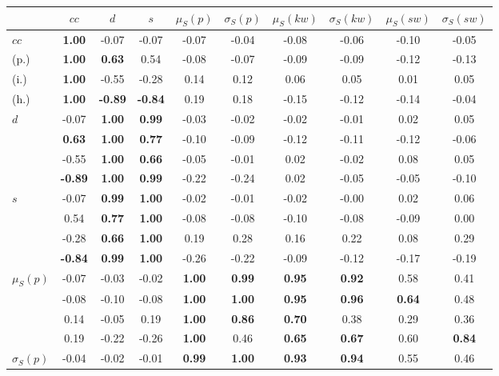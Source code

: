 \begin{table*}[h!]
\begin{center}
\begin{tabular}{| l || c | c | c | c | c | c | c | c | c |}\hline
 & $cc$ & $d$ & $s$ & $\mu_S(p)$ & $\sigma_S(p)$ & $\mu_S(kw)$ & $\sigma_S(kw)$ & $\mu_S(sw)$ & $\sigma_S(sw)$ \\\hline\hline
$cc$ & {\bf 1.00} & -0.07 & -0.07 & -0.07 & -0.04 & -0.08 & -0.06 & -0.10 & -0.05 \\
(p.) & {\bf 1.00} & {\bf 0.63} & 0.54 & -0.08 & -0.07 & -0.09 & -0.09 & -0.12 & -0.13 \\
(i.) & {\bf 1.00} & -0.55 & -0.28 & 0.14 & 0.12 & 0.06 & 0.05 & 0.01 & 0.05 \\
(h.) & {\bf 1.00} & {\bf -0.89} & {\bf -0.84} & 0.19 & 0.18 & -0.15 & -0.12 & -0.14 & -0.04 \\\hline
$d$ & -0.07 & {\bf 1.00} & {\bf 0.99} & -0.03 & -0.02 & -0.02 & -0.01 & 0.02 & 0.05 \\
 & {\bf 0.63} & {\bf 1.00} & {\bf 0.77} & -0.10 & -0.09 & -0.12 & -0.11 & -0.12 & -0.06 \\
 & -0.55 & {\bf 1.00} & {\bf 0.66} & -0.05 & -0.01 & 0.02 & -0.02 & 0.08 & 0.05 \\
 & {\bf -0.89} & {\bf 1.00} & {\bf 0.99} & -0.22 & -0.24 & 0.02 & -0.05 & -0.05 & -0.10 \\\hline
$s$ & -0.07 & {\bf 0.99} & {\bf 1.00} & -0.02 & -0.01 & -0.02 & -0.00 & 0.02 & 0.06 \\
 & 0.54 & {\bf 0.77} & {\bf 1.00} & -0.08 & -0.08 & -0.10 & -0.08 & -0.09 & 0.00 \\
 & -0.28 & {\bf 0.66} & {\bf 1.00} & 0.19 & 0.28 & 0.16 & 0.22 & 0.08 & 0.29 \\
 & {\bf -0.84} & {\bf 0.99} & {\bf 1.00} & -0.26 & -0.22 & -0.09 & -0.12 & -0.17 & -0.19 \\\hline
$\mu_S(p)$ & -0.07 & -0.03 & -0.02 & {\bf 1.00} & {\bf 0.99} & {\bf 0.95} & {\bf 0.92} & 0.58 & 0.41 \\
 & -0.08 & -0.10 & -0.08 & {\bf 1.00} & {\bf 1.00} & {\bf 0.95} & {\bf 0.96} & {\bf 0.64} & 0.48 \\
 & 0.14 & -0.05 & 0.19 & {\bf 1.00} & {\bf 0.86} & {\bf 0.70} & 0.38 & 0.29 & 0.36 \\
 & 0.19 & -0.22 & -0.26 & {\bf 1.00} & 0.46 & {\bf 0.65} & {\bf 0.67} & 0.60 & {\bf 0.84} \\\hline
$\sigma_S(p)$ & -0.04 & -0.02 & -0.01 & {\bf 0.99} & {\bf 1.00} & {\bf 0.93} & {\bf 0.94} & 0.55 & 0.46 \\

\end{tabular}
\end{center}
\end{table*}
